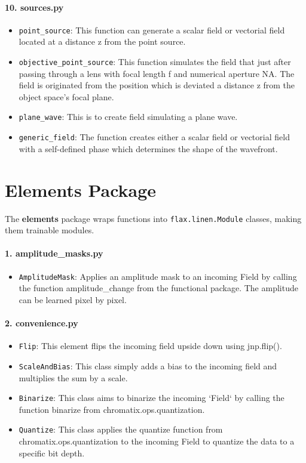 \documentclass[a4paper,12pt]{report}
\begin{document}
\paragraph*{10. \textbf{sources.py}}
\begin{itemize}
  \item \texttt{point\_source}: This function can generate a scalar field or vectorial field located at a distance z from the point source.
  \item \texttt{objective\_point\_source}: This function simulates the field that just after passing through a lens with focal length f and numerical aperture NA. The field is originated from the position which is deviated a distance z from the object space's focal plane.
  \item \texttt{plane\_wave}: This is to create field simulating a plane wave.
  \item \texttt{generic\_field}: The function creates either a scalar field or vectorial field with a self-defined phase which determines the shape of the wavefront.
\end{itemize}

\section{Elements Package}
The \textbf{elements} package wraps functions into \texttt{flax.linen.Module} classes, making them trainable modules.
\paragraph*{1. \textbf{amplitude\_masks.py}}
\begin{itemize}
  \item \texttt{AmplitudeMask}: Applies an amplitude mask to an incoming Field by calling the function amplitude\_change from the functional package. The amplitude can be learned pixel by pixel.
\end{itemize}

\paragraph*{2. \textbf{convenience.py}}
\begin{itemize}
  \item \texttt{Flip}: This element flips the incoming field upside down using jnp.flip().
  \item \texttt{ScaleAndBias}: This class simply adds a bias to the incoming field and multiplies the sum by a scale.
  \item \texttt{Binarize}: This class aims to binarize the incoming `Field` by calling the function binarize from chromatix.ops.quantization.
  \item \texttt{Quantize}: This class applies the quantize function from chromatix.ops.quantization to the incoming Field to quantize the data to a specific bit depth. 
\end{itemize}
\end{document}
